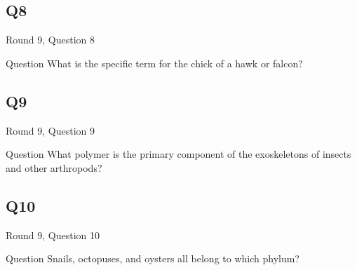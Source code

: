 \documentclass[11pt]{beamer}
\begin{document}
\subsection*{Q8}
\begin{frame}[t]{Round 9, Question 8}
\begin{block}{Question}
What is the specific term for the chick of a hawk or falcon?
\end{block}
\end{frame}
\subsection*{Q9}
\begin{frame}[t]{Round 9, Question 9}
\begin{block}{Question}
What polymer is the primary component of the exoskeletons of insects and other arthropods?
\end{block}
\end{frame}
\subsection*{Q10}
\begin{frame}[t]{Round 9, Question 10}
\begin{block}{Question}
Snails, octopuses, and oysters all belong to which phylum?
\end{block}
\end{frame}
\end{document}

